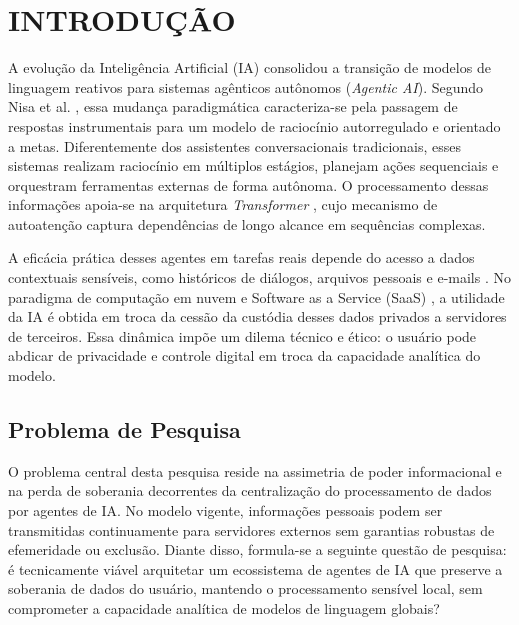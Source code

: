 \textual

\chapter{INTRODUÇÃO}
A evolução da Inteligência Artificial (IA) consolidou a transição de modelos de linguagem reativos para sistemas agênticos autônomos (\textit{Agentic AI}). Segundo Nisa et al. \cite{nisa2025}, essa mudança paradigmática caracteriza-se pela passagem de respostas instrumentais para um modelo de raciocínio autorregulado e orientado a metas. Diferentemente dos assistentes conversacionais tradicionais, esses sistemas realizam raciocínio em múltiplos estágios, planejam ações sequenciais e orquestram ferramentas externas de forma autônoma. O processamento dessas informações apoia-se na arquitetura \textit{Transformer} \cite{vaswani2017}, cujo mecanismo de autoatenção captura dependências de longo alcance em sequências complexas.

A eficácia prática desses agentes em tarefas reais depende do acesso a dados contextuais sensíveis, como históricos de diálogos, arquivos pessoais e e-mails \cite{liu2024}. No paradigma de computação em nuvem e Software as a Service (SaaS) \cite{wu2011}, a utilidade da IA é obtida em troca da cessão da custódia desses dados privados a servidores de terceiros. Essa dinâmica impõe um dilema técnico e ético: o usuário pode abdicar de privacidade e controle digital em troca da capacidade analítica do modelo.

\section{Problema de Pesquisa}
O problema central desta pesquisa reside na assimetria de poder informacional e na perda de soberania decorrentes da centralização do processamento de dados por agentes de IA. No modelo vigente, informações pessoais podem ser transmitidas continuamente para servidores externos sem garantias robustas de efemeridade ou exclusão. Diante disso, formula-se a seguinte questão de pesquisa: é tecnicamente viável arquitetar um ecossistema de agentes de IA que preserve a soberania de dados do usuário, mantendo o processamento sensível local, sem comprometer a capacidade analítica de modelos de linguagem globais?

